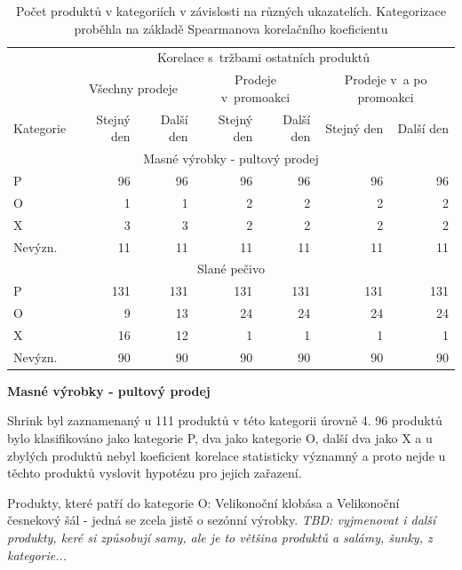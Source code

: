 \begin{table}[hbtp!]
    \centering
    \captionsetup{justification=centering}
    \caption{Počet produktů v kategoriích v závislosti na různých ukazatelích. Kategorizace proběhla na základě Spearmanova korelačního koeficientu}
    \begin{tabular}{l *{6}{r}}
    \toprule
    \multicolumn{1}{l}{} & \multicolumn{6}{c}{Korelace s~tržbami ostatních produktů} \\
    \multicolumn{1}{l}{} & \multicolumn{2}{c}{Všechny prodeje} & \multicolumn{2}{c}{Prodeje v~promoakci}  & \multicolumn{2}{c}{Prodeje v~a po promoakci} \\
    Kategorie & Stejný den & Další den & Stejný den & Další den & Stejný den & Další den \\
    \midrule
    \multicolumn{7}{c}{Masné výrobky - pultový prodej} \\
    \midrule
    P           & 96   & 96   & 96   & 96   & 96   & 96   \\
    O           & 1     & 1   & 2   & 2   & 2   & 2   \\
    X           & 3     & 3   & 2   & 2   & 2   & 2   \\
    Nevýzn.     & 11    & 11   & 11   & 11   & 11   & 11   \\
    \midrule
    \multicolumn{7}{c}{Slané pečivo} \\
    \midrule
    P           & 131   & 131   & 131   & 131   & 131   & 131   \\
    O           & 9     & 13   & 24   & 24   & 24   & 24   \\
    X           & 16    & 12   & 1    & 1    & 1    & 1    \\
    Nevýzn.     & 90    & 90   & 90   & 90   & 90   & 90   \\
    \bottomrule

    \end{tabular}
    \label{tab:kategCorrPorovnani}
\end{table}



\textbf{Masné výrobky - pultový prodej}

Shrink byl zaznamenaný u 111 produktů v této kategorii úrovně 4. 96 produktů bylo klasifikováno jako kategorie P, dva jako kategorie O, další dva jako X a u zbylých produktů nebyl koeficient korelace statisticky významný a proto nejde u těchto produktů vyslovit hypotézu pro jejich zařazení.

Produkty, které patří do kategorie O: Velikonoční klobása a Velikonoční česnekový šál - jedná se zcela jistě o sezónní výrobky. \emph{TBD: vyjmenovat i další produkty, keré si způsobují samy, ale je to většina produktů a salámy, šunky, z kategorie...} 

